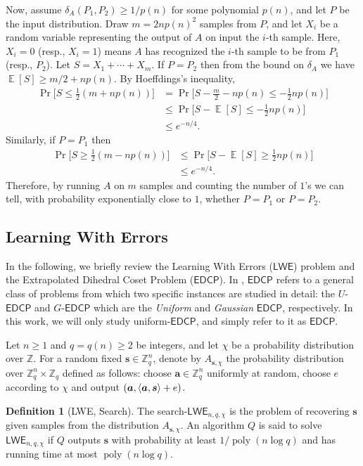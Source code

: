 \documentclass[11pt]{article}
\theoremstyle{plain}
\theoremstyle{definition}
\newtheorem{definition}[theorem]{Definition}
\DeclareMathOperator{\poly}{poly}
\DeclareMathOperator{\E}{\mathbb{E}}
\DeclarePairedDelimiter{\lrang}{\langle}{\rangle}
\def\Z{\mathbb{Z}}
\def\lwe{\mathsf{LWE}}
\def\edcp{\mathsf{EDCP}}
\begin{document}
Now, assume $\delta_A(P_1, P_2) \ge 1 / p(n)$ for some polynomial $p(n)$, and let $P$ be the input distribution. Draw $m = 2np(n)^2$ samples from $P$, and let $X_i$ be a random variable representing the output of $A$ on input the $i$-th sample. Here, $X_i = 0$ (resp., $X_i = 1$) means $A$ has recognized the $i$-th sample to be from $P_1$ (resp., $P_2$). Let $S = X_1 + \cdots + X_m$. If $P = P_2$ then from the bound on $\delta_A$ we have $\E[S] \ge m / 2 + np(n)$. By Hoeffdings's inequality,
\begin{align*}
    \Pr\Big[ S \le \frac{1}{2} (m + np(n)) \Big]
    & = \Pr\Big[ S - \frac{m}{2} - np(n) \le -\frac{1}{2}np(n) \Big] \\
    & \le \Pr\Big[ S - \E[S] \le -\frac{1}{2}np(n) \Big] \\
    & \le e^{-n / 4}.
\end{align*}
Similarly, if $P = P_1$ then
\begin{align*}
    \Pr\Big[ S \ge \frac{1}{2} (m - np(n)) \Big]
    & \le \Pr\Big[ S - \E[S] \ge \frac{1}{2}np(n) \Big] \\
    & \le e^{-n / 4}.
\end{align*}
Therefore, by running $A$ on $m$ samples and counting the number of $1$'s we can tell, with probability exponentially close to $1$, whether $P = P_1$ or $P = P_2$.



\subsection{Learning With Errors}

In the following, we briefly review the Learning With Errors ($\lwe$) problem and the Extrapolated Dihedral Coset Problem ($\edcp$). In \cite{brakerski2018learning}, $\edcp$ refers to a general class of problems from which two specific instances are studied in detail: the $U$-$\edcp$ and $G$-$\edcp$ which are the \textit{Uniform} and \textit{Gaussian} $\edcp$, respectively. In this work, we will only study uniform-$\edcp$, and simply refer to it as $\edcp$.

Let $n \ge 1$ and $q = q(n) \ge 2$ be integers, and let $\chi$ be a probability distribution over $\Z$. For a random fixed $\bm{s} \in \Z_q^n$, denote by $A_{\bm{s}, \chi}$ the probability distribution over $\Z_q^n \times \Z_q$ defined as follows: choose $\bm{a} \in \Z_q^n$ uniformly at random, choose $e$ according to $\chi$ and output $(\bm{a}, \lrang{\bm{a}, \bm{s}} + e)$.

\begin{definition}[LWE, Search]
The search-$\lwe_{n, q, \chi}$ is the problem of recovering $\bm{s}$ given samples from the distribution $A_{\bm{s}, \chi}$. An algorithm $Q$ is said to solve $\lwe_{n, q, \chi}$ if $Q$  outputs $\bm{s}$ with probability at least $1 / \poly(n\log q)$ and has running time at most $\poly(n \log q)$.
\end{definition}
\end{document}
